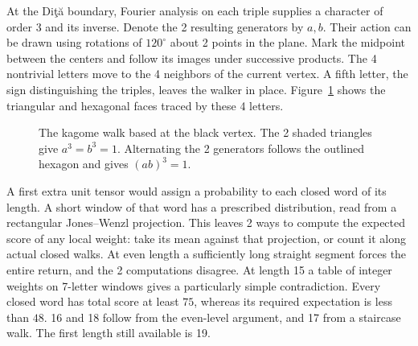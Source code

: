 \documentclass[11pt,a4paper]{amsart}
\begin{document}
At the Di\c t\u a boundary, Fourier analysis on each triple supplies a character of order 3 and its inverse. Denote the 2 resulting generators by $a,b$. Their action can be drawn using rotations of $120^\circ$ about 2 points in the plane. Mark the midpoint between the centers and follow its images under successive products. The 4 nontrivial letters move to the 4 neighbors of the current vertex. A fifth letter, the sign distinguishing the triples, leaves the walker in place. Figure~\ref{fig:introkagome} shows the triangular and hexagonal faces traced by these 4 letters.

\begin{figure}[htb]
\centering
{}
\caption{The kagome walk based at the black vertex. The 2 shaded triangles give $a^3=b^3=1$. Alternating the 2 generators follows the outlined hexagon and gives $(ab)^3=1$.}\label{fig:introkagome}
\end{figure}

A first extra unit tensor would assign a probability to each closed word of its length. A short window of that word has a prescribed distribution, read from a rectangular Jones--Wenzl projection. This leaves 2 ways to compute the expected score of any local weight: take its mean against that projection, or count it along actual closed walks. At even length a sufficiently long straight segment forces the entire return, and the 2 computations disagree. At length 15 a table of integer weights on 7-letter windows gives a particularly simple contradiction. Every closed word has total score at least $75$, whereas its required expectation is less than $48$. 16 and 18 follow from the even-level argument, and 17 from a staircase walk. The first length still available is 19.
\end{document}
